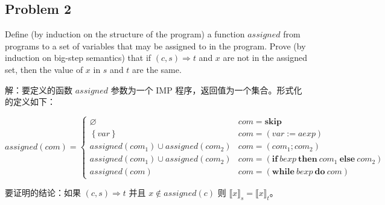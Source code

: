 \documentclass[UTF8]{ctexart}
\begin{document}
\begin{itemize}
    \end{itemize}

    \newpage
    
    \subsection*{Problem 2}

    \begin{framed}
        Define (by induction on the structure of the program) a function $assigned$ from programs to a set of variables that may be assigned to in the program. Prove (by induction on big-step semantics) that if $(c, s) \Rightarrow t$ and $x$ are not in the assigned set, then the value of $x$ in $s$ and $t$ are the same.
    \end{framed}

    解：要定义的函数 $assigned$ 参数为一个 IMP 程序，返回值为一个集合。形式化的定义如下：

    $$
    assigned(com) = \begin{cases}
        \varnothing & com=\mathbf{skip} \\
        \left\{var\right\} & com=(var := aexp) \\
        assigned({com}_1) \cup assigned({com}_2) & com=({com}_1; {com}_2) \\
        assigned({com}_1) \cup assigned({com}_2) & com=(\mathbf{if}\ bexp\ \mathbf{then}\ {com}_1\ \mathbf{else}\ {com}_2) \\
        assigned(com) & com=(\mathbf{while}\ bexp\ \mathbf{do}\ com)
    \end{cases}
    $$

    要证明的结论：如果 $(c, s) \Rightarrow t$ 并且 $x \notin assigned(c)$ 则 ${\llbracket x \rrbracket}_s = {\llbracket x \rrbracket}_t$。
\end{document}
